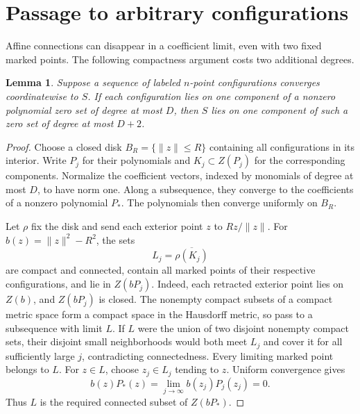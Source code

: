 \documentclass[11pt,letterpaper]{article}
\newcommand{\norm}[1]{\lVert#1\rVert}
\newtheorem{lemma}[theorem]{Lemma}
\begin{document}
\section{Passage to arbitrary configurations}
Affine connections can disappear in a coefficient limit, even with two fixed marked points. The following compactness argument costs two additional degrees.
\begin{lemma}\label{lem:limit}
Suppose a sequence of labeled $n$-point configurations converges coordinatewise to $S$. If each configuration lies on one component of a nonzero polynomial zero set of degree at most $D$, then $S$ lies on one component of such a zero set of degree at most $D+2$.
\end{lemma}
\begin{proof}
Choose a closed disk $B_R=\{\norm z\leq R\}$ containing all configurations in its interior. Write $P_j$ for their polynomials and $K_j\subset Z(P_j)$ for the corresponding components. Normalize the coefficient vectors, indexed by monomials of degree at most $D$, to have norm one. Along a subsequence, they converge to the coefficients of a nonzero polynomial $P_*$. The polynomials then converge uniformly on $B_R$.

Let $\rho$ fix the disk and send each exterior point $z$ to $Rz/\norm z$. For $b(z)=\norm z^2-R^2$, the sets
\[
L_j=\overline{\rho(K_j)}
\]
are compact and connected, contain all marked points of their respective configurations, and lie in $Z(bP_j)$. Indeed, each retracted exterior point lies on $Z(b)$, and $Z(bP_j)$ is closed. The nonempty compact subsets of a compact metric space form a compact space in the Hausdorff metric, so pass to a subsequence with limit $L$. If $L$ were the union of two disjoint nonempty compact sets, their disjoint small neighborhoods would both meet $L_j$ and cover it for all sufficiently large $j$, contradicting connectedness. Every limiting marked point belongs to $L$. For $z\in L$, choose $z_j\in L_j$ tending to $z$. Uniform convergence gives
\[
b(z)P_*(z)=\lim_{j\to\infty}b(z_j)P_j(z_j)=0.
\]
Thus $L$ is the required connected subset of $Z(bP_*)$.
\end{proof}
\end{document}
